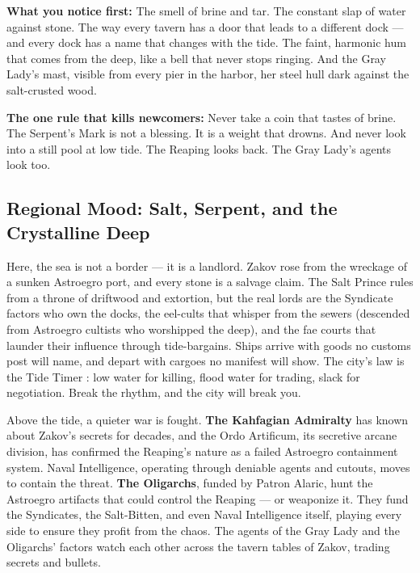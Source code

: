 \begin{tcolorbox}[colback=black!3,colframe=blue!60!black,title={Theme \& Atmosphere},breakable]
\vspace{2mm}
\textbf{What you notice first:} The smell of brine and tar. The constant slap of water against stone. The way every tavern has a door that leads to a different dock --- and every dock has a name that changes with the tide. The faint, harmonic hum that comes from the deep, like a bell that never stops ringing. And the Gray Lady's mast, visible from every pier in the harbor, her steel hull dark against the salt-crusted wood.

\textbf{The one rule that kills newcomers:} Never take a coin that tastes of brine. The Serpent's Mark is not a blessing. It is a weight that drowns. And never look into a still pool at low tide. The Reaping looks back. The Gray Lady's agents look too.
\end{tcolorbox}

\subsection*{Regional Mood: Salt, Serpent, and the Crystalline Deep}

Here, the sea is not a border --- it is a landlord. Zakov rose from the wreckage of a sunken Astroegro port, and every stone is a salvage claim. The Salt Prince rules from a throne of driftwood and extortion, but the real lords are the Syndicate factors who own the docks, the eel-cults that whisper from the sewers (descended from Astroegro cultists who worshipped the deep), and the fae courts that launder their influence through tide-bargains. Ships arrive with goods no customs post will name, and depart with cargoes no manifest will show. The city's law is the Tide Timer : low water for killing, flood water for trading, slack for negotiation. Break the rhythm, and the city will break you.

Above the tide, a quieter war is fought. \textbf{The Kahfagian Admiralty} has known about Zakov's secrets for decades, and the Ordo Artificum, its secretive arcane division, has confirmed the Reaping's nature as a failed Astroegro containment system. Naval Intelligence, operating through deniable agents and cutouts, moves to contain the threat. \textbf{The Oligarchs}, funded by Patron Alaric, hunt the Astroegro artifacts that could control the Reaping --- or weaponize it. They fund the Syndicates, the Salt-Bitten, and even Naval Intelligence itself, playing every side to ensure they profit from the chaos. The agents of the Gray Lady and the Oligarchs' factors watch each other across the tavern tables of Zakov, trading secrets and bullets.

